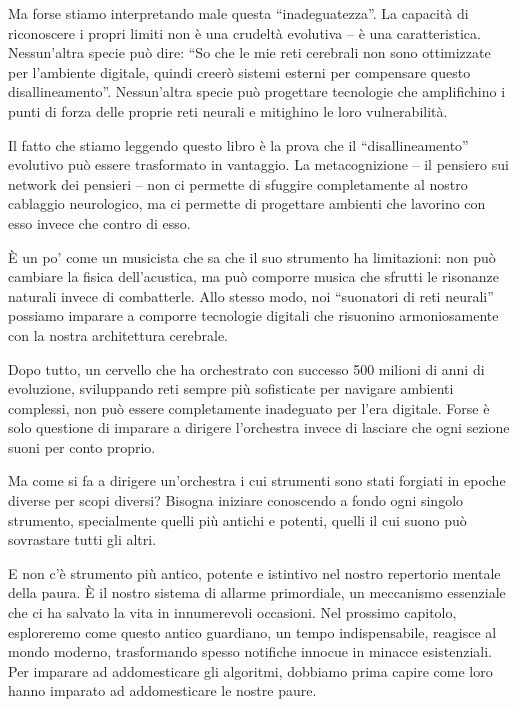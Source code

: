 Ma forse stiamo interpretando male questa ``inadeguatezza''. La capacità di riconoscere i propri limiti non è una crudeltà evolutiva – è una caratteristica. Nessun'altra specie può dire: ``So che le mie reti cerebrali non sono ottimizzate per l'ambiente digitale, quindi creerò sistemi esterni per compensare questo disallineamento''. Nessun'altra specie può progettare tecnologie che amplifichino i punti di forza delle proprie reti neurali e mitighino le loro vulnerabilità.

Il fatto che stiamo leggendo questo libro è la prova che il ``disallineamento'' evolutivo può essere trasformato in vantaggio. La metacognizione – il pensiero sui network dei pensieri – non ci permette di sfuggire completamente al nostro cablaggio neurologico, ma ci permette di progettare ambienti che lavorino con esso invece che contro di esso.

È un po' come un musicista che sa che il suo strumento ha limitazioni: non può cambiare la fisica dell'acustica, ma può comporre musica che sfrutti le risonanze naturali invece di combatterle. Allo stesso modo, noi ``suonatori di reti neurali'' possiamo imparare a comporre tecnologie digitali che risuonino armoniosamente con la nostra architettura cerebrale.

Dopo tutto, un cervello che ha orchestrato con successo 500 milioni di anni di evoluzione, sviluppando reti sempre più sofisticate per navigare ambienti complessi, non può essere completamente inadeguato per l'era digitale. Forse è solo questione di imparare a dirigere l'orchestra invece di lasciare che ogni sezione suoni per conto proprio.

Ma come si fa a dirigere un'orchestra i cui strumenti sono stati forgiati in epoche diverse per scopi diversi? Bisogna iniziare conoscendo a fondo ogni singolo strumento, specialmente quelli più antichi e potenti, quelli il cui suono può sovrastare tutti gli altri.

E non c'è strumento più antico, potente e istintivo nel nostro repertorio mentale della paura. È il nostro sistema di allarme primordiale, un meccanismo essenziale che ci ha salvato la vita in innumerevoli occasioni. 
Nel prossimo capitolo, esploreremo come questo antico guardiano, un tempo indispensabile, reagisce al mondo moderno, trasformando spesso notifiche innocue in minacce esistenziali. Per imparare ad addomesticare gli algoritmi, dobbiamo prima capire come loro hanno imparato ad addomesticare le nostre paure.